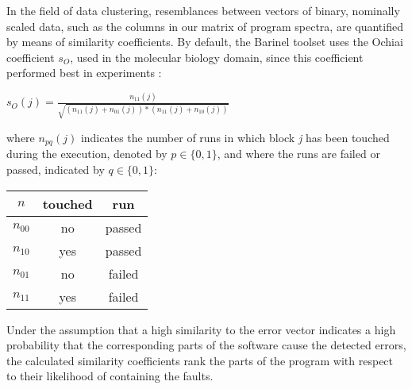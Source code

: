 In the field of data clustering, resemblances between
vectors of binary, nominally scaled data, such as the
columns in our matrix of program spectra, are 
quantified by means of similarity coefficients.
By default, the Barinel toolset uses the Ochiai coefficient
$s_O$, used in the molecular biology domain,
since this coefficient performed best in experiments
\cite{sfltaicpart}:\\
\begin{center}
$s_O(j) = \frac{n_{11}(j)}{\sqrt{(n_{11}(j)+n_{01}(j))*(n_{11}(j)+n_{10}(j))}}$\\
\end{center}
where $n_{pq}(j)$ indicates the number of runs in which block \emph{j} 
has been touched during the execution, denoted by $p \in \{0,1\}$,
and where the runs are failed or passed, indicated by $q \in \{0,1\}$:
\begin{center}
\begin{tabular}{c|c|c}
$n$ & touched & run \\
\hline
$n_{00}$ & no & passed \\
$n_{10}$ & yes & passed \\
$n_{01}$ & no & failed \\
$n_{11}$ & yes & failed \\
\end{tabular}
\end{center}

Under the assumption that a high similarity to the
error vector indicates a high probability that the corresponding parts of the software cause the detected
errors, the calculated similarity coefficients rank the
parts of the program with respect to their likelihood of
containing the faults.

